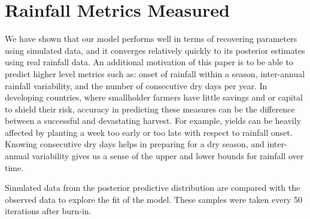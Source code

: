 \documentclass[11pt]{article}
\begin{document}

\newpage

\section{Rainfall Metrics Measured}
\label{sec:metrics}

We have shown that our model performs well in terms of recovering parameters using simulated data, and it converges relatively quickly to its posterior estimates using real rainfall data. An additional motivation of this paper is to be able to predict higher level metrics such as: onset of rainfall within a season, inter-annual rainfall variability, and the number of consecutive dry days per year. In developing countries, where smallholder farmers have little savings and or capital to shield their risk, accuracy in predicting these measures can be the difference between a successful and devastating harvest. For example, yields can be heavily affected by planting a week too early or too late with respect to rainfall onset. Knowing consecutive dry days helps in preparing for a dry season, and inter-annual variability gives us a sense of the upper and lower bounds for rainfall over time. 

Simulated data from the posterior predictive distribution are compared with the observed data to explore the fit of the model. These samples were taken every 50 iterations after burn-in. 




\end{document}
